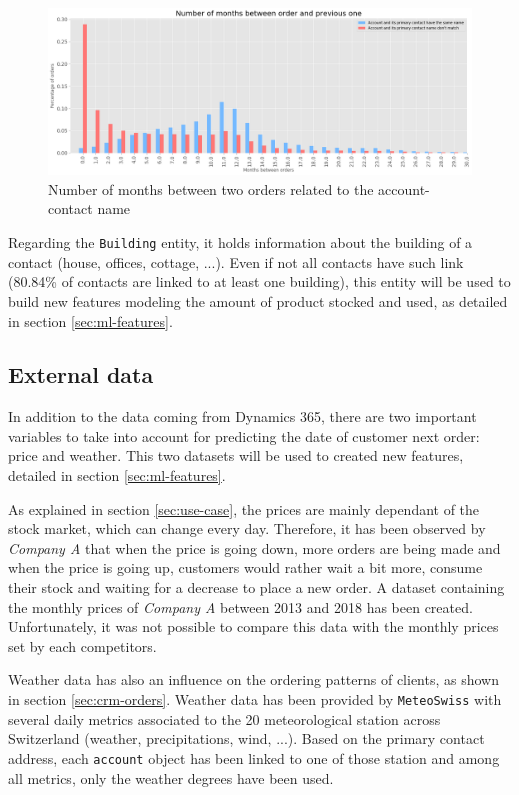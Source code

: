 \begin{figure}[h]
    \centering
    \includegraphics[width=15cm]{images/account-contact-name-orders.png}
    \caption[Account and contact's name influence of order's frequency]{Number of months between two orders related to the account-contact name}
    \label{fig:account-contact-name-orders}
\end{figure}

Regarding the \texttt{Building} entity, it holds information about the building of a contact (house, offices, cottage, ...). Even if not all contacts have such link (80.84\% of contacts are linked to at least one building), this entity will be used to build new features modeling the amount of product stocked and used, as detailed in section \ref{sec:ml-features}.


\subsection{External data}\label{sec:external-data}
In addition to the data coming from Dynamics 365, there are two important variables to take into account for predicting the date of customer next order: price and weather. This two datasets will be used to created new features, detailed in section \ref{sec:ml-features}.

As explained in section \ref{sec:use-case}, the prices are mainly dependant of the stock market, which can change every day. Therefore, it has been observed by \textit{Company A} that when the price is going down, more orders are being made and when the price is going up, customers would rather wait a bit more, consume their stock and waiting for a decrease to place a new order. A dataset containing the monthly prices of \textit{Company A} between 2013 and 2018 has been created. Unfortunately, it was not possible to compare this data with the monthly prices set by each competitors.

Weather data has also an influence on the ordering patterns of clients, as shown in section \ref{sec:crm-orders}. Weather data has been provided by \texttt{MeteoSwiss} with several daily metrics associated to the 20 meteorological station across Switzerland (weather, precipitations, wind, ...). Based on the primary contact address, each \texttt{account} object has been linked to one of those station and among all metrics, only the weather degrees \big[°C\big] have been used.


